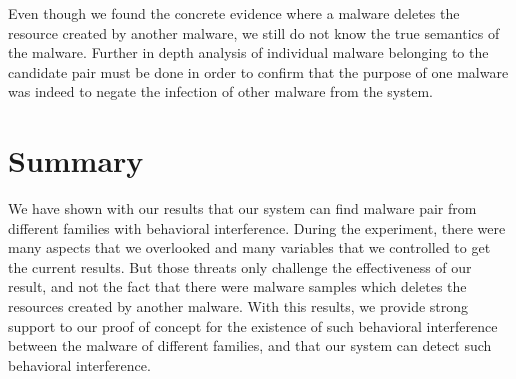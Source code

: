 Even though we found the concrete evidence where a malware deletes the resource created by another malware, we still do not know the true semantics of the malware.
Further in depth analysis of individual malware belonging to the candidate pair must be done in order to confirm that the purpose of one malware was indeed to negate the infection of other malware from the system.
\section{Summary}
\label{sec:Summary}

We have shown with our results that our system can find malware pair from different families with behavioral interference.
During the experiment, there were  many aspects that we overlooked and many variables that we controlled to get the current results.
But those threats only challenge the effectiveness of our result, and not the fact that there were malware samples which deletes the resources created by another malware.
With this results, we provide strong support to our proof of concept for the existence of such behavioral interference between the malware of different families, and that our system can detect such behavioral interference.


